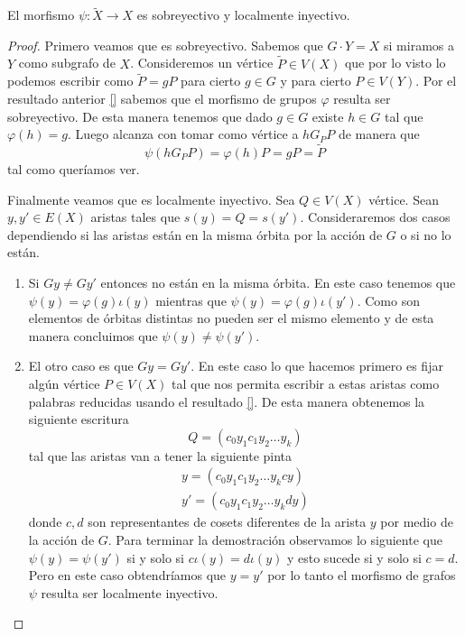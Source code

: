\documentclass[tesis.tex]{subfiles}
\newcommand{\Xm}{\widetilde X}
\begin{document}
\begin{prop}
	El morfismo $\psi: \Xm \to X$ es sobreyectivo y localmente inyectivo.
\end{prop}
\begin{proof}
	Primero veamos que es sobreyectivo.
	Sabemos que $G \cdot Y = X$ si miramos a $Y$ como subgrafo de $X$.
	Consideremos un vértice $\widetilde P \in V(X)$ que por lo visto lo podemos escribir como $\widetilde P = g P$ para cierto $g \in G$ y para cierto $P \in V(Y)$.
	Por el resultado anterior \ref{} sabemos que el morfismo de grupos $\varphi$ resulta ser sobreyectivo.
	De esta manera tenemos que dado $g \in G$ existe $h \in G$ tal que $\varphi(h) = g$. 
	Luego alcanza con tomar como vértice a $h G_P P $ de manera que 
	\[
	\psi(h G_P P ) = \varphi(h) P = g P = \widetilde P
	\]
	tal como queríamos ver.
	
	
	Finalmente veamos que es localmente inyectivo.
	Sea $Q \in V(X)$ vértice. 
	Sean $y,y' \in E(X)$ aristas tales que $s(y) = Q = s(y')$.
	Consideraremos dos casos dependiendo si las aristas están en la misma órbita por la acción de $G$ o si no lo están.
	
	\begin{enumerate}
		\item Si $Gy \neq Gy'$ entonces no están en la misma órbita.
		En este caso tenemos que $\psi(y) = \varphi(g) \iota (y)$ mientras que $\psi(y) = \varphi(g) \iota (y')$.
		Como son elementos de órbitas distintas no pueden ser el mismo elemento y de esta manera concluimos que $\psi(y) \neq \psi(y').$
		\item El otro caso es que $Gy = Gy'$. 
		En este caso lo que hacemos primero es fijar algún vértice $P \in V(X)$ tal que nos permita escribir a estas aristas como palabras reducidas usando el resultado \ref{}.
		De esta manera obtenemos la siguiente escritura 
		\[
		Q = (c_0y_1c_1y_2 \dots y_k)
		\]
		tal que las aristas van a tener la siguiente pinta 
		\begin{align*}
			y = (c_0y_1c_1y_2 \dots y_k c y) \\
			y' = (c_0y_1c_1y_2 \dots y_k d y)
		\end{align*}
		donde $c,d$ son representantes de cosets diferentes de la arista $y$ por medio de la acción de $G$.
		Para terminar la demostración observamos lo siguiente que $\psi(y) = \psi(y')$ si y solo si $c \iota(y) = d \iota(y)$ y esto sucede si y solo si $c = d$. 
		Pero en este caso obtendríamos que $y = y'$ por lo tanto el morfismo de grafos $\psi$ resulta ser localmente inyectivo.
	\end{enumerate}
\end{proof}
\end{document}
